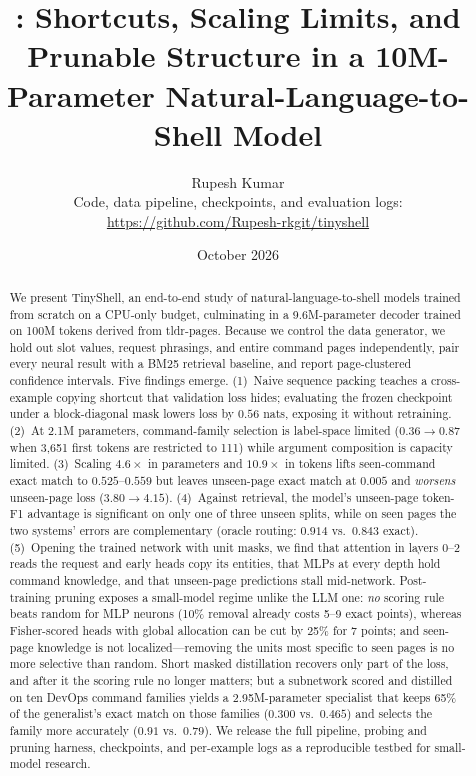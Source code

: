 \documentclass[11pt,a4paper]{article}
\title{\textbf{\modelname{}: Shortcuts, Scaling Limits, and Prunable Structure in a
10M-Parameter Natural-Language-to-Shell Model}}
\author{Rupesh Kumar\\
\normalsize Code, data pipeline, checkpoints, and evaluation logs:\\
\normalsize \url{https://github.com/Rupesh-rkgit/tinyshell}}
\date{October 2026}
\newcommand{\modelname}{TinyShell}
\begin{document}
\maketitle

\begin{abstract}
We present \modelname{}, an end-to-end study of natural-language-to-shell
models trained from scratch on a CPU-only budget, culminating in a
9.6M-parameter decoder trained on 100M tokens derived from tldr-pages.
Because we control the data generator, we hold out slot values, request
phrasings, and entire command pages independently, pair every neural result
with a BM25 retrieval baseline, and report page-clustered confidence
intervals. Five findings emerge. (1)~Naive sequence packing teaches a
cross-example copying shortcut that validation loss hides; evaluating the
frozen checkpoint under a block-diagonal mask lowers loss by $0.56$ nats,
exposing it without retraining. (2)~At 2.1M parameters, command-family
selection is label-space limited ($0.36\!\to\!0.87$ when 3{,}651 first tokens
are restricted to 111) while argument composition is capacity limited.
(3)~Scaling $4.6\times$ in parameters and $10.9\times$ in tokens lifts
seen-command exact match to $0.525$--$0.559$ but leaves unseen-page exact
match at $0.005$ and \emph{worsens} unseen-page loss ($3.80\!\to\!4.15$).
(4)~Against retrieval, the model's unseen-page token-F1 advantage is
significant on only one of three unseen splits, while on seen pages the two
systems' errors are complementary (oracle routing: $0.914$ vs.\ $0.843$ exact).
(5)~Opening the trained network with unit masks, we find that attention in
layers 0--2 reads the request and early heads copy its entities, that MLPs
at every depth hold command knowledge, and that unseen-page predictions stall
mid-network. Post-training pruning exposes a small-model regime unlike the
LLM one: \emph{no} scoring rule beats random for MLP neurons (10\% removal
already costs 5--9 exact points), whereas Fisher-scored heads with global
allocation can be cut by 25\% for 7 points; and seen-page knowledge is not
localized---removing the units most specific to seen pages is no more
selective than random. Short masked distillation recovers only part of the
loss, and after it the scoring rule no longer matters; but a subnetwork scored
and distilled on ten DevOps command families yields a 2.95M-parameter
specialist that keeps 65\% of the generalist's exact match on those families
($0.300$ vs.\ $0.465$) and selects the family more accurately ($0.91$ vs.\
$0.79$).
We release the full pipeline, probing and pruning harness, checkpoints, and
per-example logs as a reproducible testbed for small-model research.
\end{abstract}
\end{document}
